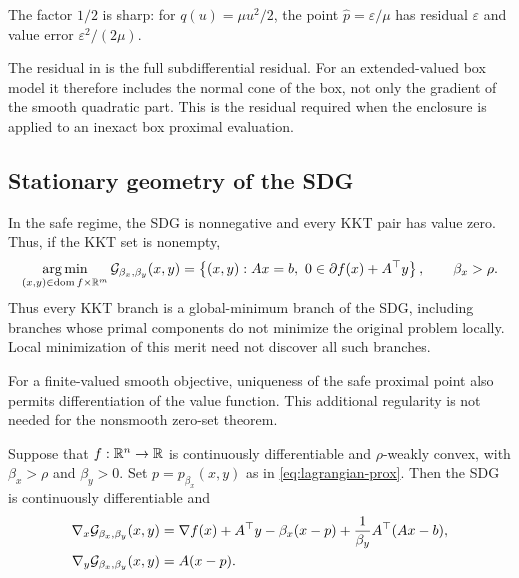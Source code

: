 The factor \(1/2\) is sharp: for \(q(u)=\mu u^2/2\), the point
\(\widehat p=\varepsilon/\mu\) has residual \(\varepsilon\) and value error
\(\varepsilon^2/(2\mu)\).

The residual in  is the full subdifferential
residual.  For an extended-valued box model it therefore includes the normal
cone of the box, not only the gradient of the smooth quadratic part.  This is
the residual required when the enclosure is applied to an inexact box
proximal evaluation.

\subsection{Stationary geometry of the SDG}
\label{subsec:sdg-merit-geometry}

In the safe regime, the SDG is nonnegative and every KKT pair has value zero.
Thus, if the KKT set is nonempty,
\begin{equation}
  \argmin_{(x,y)\in\operatorname{dom}f\times\R^m}\G_{\beta_x,\beta_y}(x,y)
  =
  \left\{(x,y):Ax=b,\ 
    0\in\partial f(x)+A^\top y\right\},
  \qquad \beta_x>\rho.
  \label{eq:sdg-global-minimizers}
\end{equation}
Thus every KKT branch is a global-minimum branch of the SDG, including
branches whose primal components do not minimize the original problem
locally.  Local minimization of this merit need not discover all such branches.

For a finite-valued smooth objective, uniqueness of the safe proximal point
also permits differentiation of the value function.  This additional
regularity is not needed for the nonsmooth zero-set theorem.

\begin{proposition}
  \label{prop:safe-sdg-gradient}
  Suppose that \(f:\mathbb{R}^n\to\mathbb{R}\) is continuously differentiable and
  \(\rho\)-weakly convex, with \(\beta_x>\rho\) and \(\beta_y>0\).  Set
  \(p=p_{\beta_x}(x,y)\) as in \cref{eq:lagrangian-prox}.  Then the SDG is
  continuously differentiable and
  \begin{align}
    \nabla_x\mathcal{G}_{\beta_x,\beta_y}(x,y)
    &=
      \nabla f(x)+A^\top y
      -\beta_x(x-p)
      +\frac{1}{\beta_y}A^\top(Ax-b),
      \label{eq:sdg-gradient-x}\\
    \nabla_y\mathcal{G}_{\beta_x,\beta_y}(x,y)
    &=
      A(x-p).
      \label{eq:sdg-gradient-y}
  \end{align}
\end{proposition}

